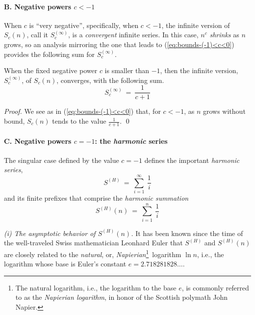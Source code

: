 \paragraph{B. Negative powers $c < -1$}

When $c$ is ``very negative'', specifically, when $c < -1$, the infinite version of $S_c(n)$, call it $S_c^{(\infty)}$, is a {\em convergent} infinite series.  In this case, $n^c$ {\em shrinks} as $n$ grows, so an analysis mirroring the one that leads to (\ref{eq:bounds-(-1)<c<0}) provides the following sum for $S_c^{(\infty)}$.

\begin{prop}
\label{thm:bounds-negative-(not-1)-sum-xc}
When the fixed negative power $c$ is smaller than $-1$, then the
infinite version, $S_c^{(\infty)}$, of $S_c(n)$, converges, with the
following sum.
\begin{equation}
\label{eq:bounds-negative-(not-1)-sum-xc}
S_c^{(\infty)} \ = \ \frac{1}{c+1}
\end{equation}
\end{prop}

\begin{proof}
We see as in (\ref{eq:bounds-(-1)<c<0}) that, for $c<-1$, as $n$ grows without bound, $S_c(n)$ tends to the value ${\displaystyle \frac{1}{c+1}}$.  \qed
\end{proof}

\paragraph{C. Negative powers $c = -1$: the {\em harmonic} series}

The singular case defined by the value $c = -1$ defines the important {\it harmonic series},
\[ S^{(H)} \ = \ \sum_{i=1}^\infty \ \frac{1}{i} \]
and its finite prefixes that comprise the {\it harmonic summation}
\[ S^{(H)}(n) \ = \ \sum_{i=1}^n \ \frac{1}{i} \]

\smallskip

 
 
{\it (i) The asymptotic behavior of $S^{(H)}(n)$.}
It has been known since the time of the well-traveled Swiss mathematician Leonhard Euler that $S^{(H)}$ and $S^{(H)}(n)$ are closely related to the {\em natural}, or, {\it Napierian}\footnote{The natural logarithm, i.e., the logarithm to the base $e$, is commonly referred to as the {\it Napierian logarithm}, in honor of the Scottish polymath John Napier.}~logarithm $\ln n$, i.e., the logarithm whose base is Euler's constant $e = 2.718281828 \ldots$.

